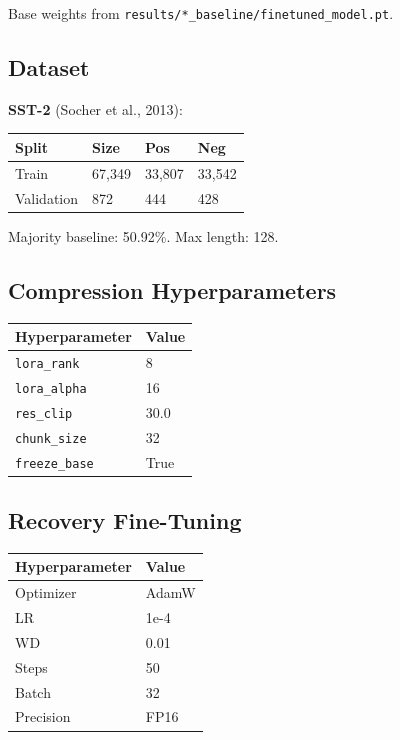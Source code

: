 Base weights from \texttt{results/*\_baseline/finetuned\_model.pt}.

\subsection{Dataset}

\textbf{SST-2} (Socher et al., 2013):

\begin{table}[H]
\centering
\small
\begin{tabular}{llll}
\toprule
\textbf{Split} & \textbf{Size} & \textbf{Pos} & \textbf{Neg} \\
\midrule
Train & 67,349 & 33,807 & 33,542 \\
Validation & 872 & 444 & 428 \\
\bottomrule
\end{tabular}
\end{table}

Majority baseline: 50.92\%. Max length: 128.

\subsection{Compression Hyperparameters}

\begin{table}[H]
\centering
\small
\begin{tabular}{ll}
\toprule
\textbf{Hyperparameter} & \textbf{Value} \\
\midrule
\texttt{lora\_rank} & 8 \\
\texttt{lora\_alpha} & 16 \\
\texttt{res\_clip} & 30.0 \\
\texttt{chunk\_size} & 32 \\
\texttt{freeze\_base} & True \\
\bottomrule
\end{tabular}
\end{table}

\subsection{Recovery Fine-Tuning}

\begin{table}[H]
\centering
\small
\begin{tabular}{ll}
\toprule
\textbf{Hyperparameter} & \textbf{Value} \\
\midrule
Optimizer & AdamW \\
LR & 1e-4 \\
WD & 0.01 \\
Steps & 50 \\
Batch & 32 \\
Precision & FP16 \\
\bottomrule
\end{tabular}
\end{table}

